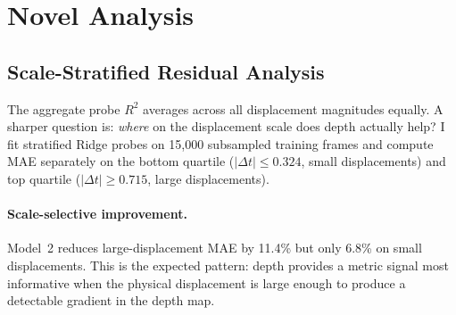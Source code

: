 \documentclass[11pt]{article}
\begin{document}
\section{Novel Analysis}

\subsection{Scale-Stratified Residual Analysis}

The aggregate probe $R^2$ averages across all displacement magnitudes equally.
A sharper question is: \emph{where} on the displacement scale does depth
actually help?
I fit stratified Ridge probes on 15,000 subsampled training frames and compute
MAE separately on the bottom quartile ($|\Delta t| \le 0.324$, small
displacements) and top quartile ($|\Delta t| \ge 0.715$, large displacements).

\begin{table}[H]
\centering
\small
\caption{Scale-stratified probe MAE on 27,562 held-out frames.
$\Delta$MAE\% is relative to base LAPA.
Only depth-equipped models show non-trivial improvement.}
\label{tab:residual}
\renewcommand{\arraystretch}{1.2}
\end{table}

\paragraph{Scale-selective improvement.}
Model~2 reduces large-displacement MAE by 11.4\% but only 6.8\% on small
displacements. This is the expected pattern: depth provides a metric signal most informative
when the physical displacement is large enough to produce a detectable gradient
in the depth map.
\end{document}

